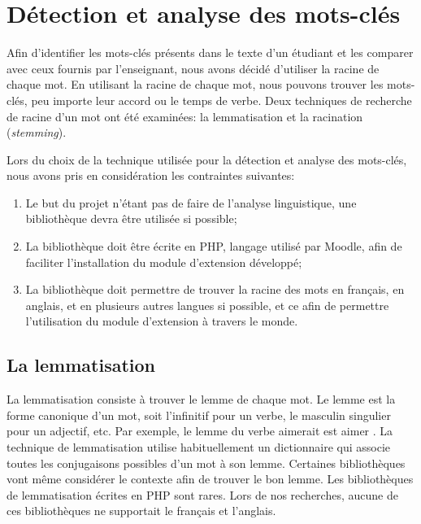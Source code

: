 \chapter{D\'etection et analyse des mots-cl\'es}
\label{chap:keywords}
Afin d'identifier les mots-cl\'es pr\'esents dans le texte d'un \'etudiant et les comparer avec ceux fournis par l'enseignant, nous avons d\'ecid\'e d'utiliser la racine de chaque mot.
En utilisant la racine de chaque mot, nous pouvons trouver les mots-cl\'es, peu importe leur accord ou le temps de verbe.
Deux techniques de recherche de racine d'un mot ont \'et\'e examin\'ees: la lemmatisation et la racination (\textit{stemming}).

Lors du choix de la technique utilis\'ee pour la d\'etection et analyse des mots-cl\'es, nous avons pris en consid\'eration les contraintes suivantes:
\begin{enumerate}
  \item Le but du projet n'\'etant pas de faire de l'analyse linguistique, une biblioth\`eque devra \^etre utilis\'ee si possible;
  \item La biblioth\`eque doit \^etre \'ecrite en PHP, langage utilis\'e par Moodle, afin de faciliter l'installation du module d'extension d\'evelopp\'e;
  \item La biblioth\`eque doit permettre de trouver la racine des mots en fran\c{c}ais, en anglais, et en plusieurs autres langues si possible, et ce afin de permettre l'utilisation du module d'extension \`a travers le monde.
\end{enumerate}

\section{La lemmatisation}
La lemmatisation consiste \`a trouver le lemme de chaque mot.
Le lemme est la forme canonique d'un mot, soit l'infinitif pour un verbe, le masculin singulier pour un adjectif, etc.
Par exemple, le lemme du verbe \og aimerait \fg{} est \og aimer \fg{}.
La  technique de lemmatisation utilise habituellement un dictionnaire qui associe toutes les conjugaisons possibles d'un mot \`a son lemme.
Certaines biblioth\`eques vont m\^eme consid\'erer le contexte afin de trouver le bon lemme.
Les biblioth\`eques de lemmatisation \'ecrites en PHP sont rares.
Lors de nos recherches, aucune de ces biblioth\`eques ne supportait le fran\c{c}ais et l'anglais.

